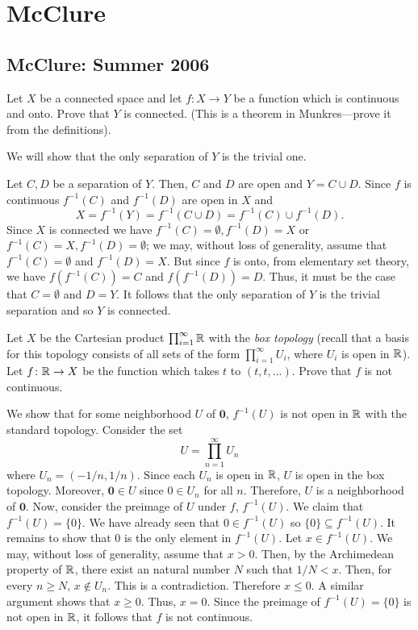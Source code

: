 \section{McClure}
\subsection{McClure: Summer 2006}
\setcounter{exercise}{0}
\setcounter{equation}{0}

\begin{problem}
  Let $X$ be a connected space and let $f\colon X\to Y$ be a function which
  is continuous and onto. Prove that $Y$ is connected. (This is a theorem
  in Munkres---prove it from the definitions).
\end{problem}
\begin{solution}
  We will show that the only separation of $Y$ is the trivial one.

  Let $C,D$ be a separation of $Y$. Then, $C$ and $D$ are open and $Y=C\cup
  D$. Since $f$ is continuous $f^{-1}(C)$ and $f^{-1}(D)$ are open in $X$
  and
  \[
    X=f^{-1}(Y)=f^{-1}(C\cup D)=f^{-1}(C)\cup f^{-1}(D).
  \]
  Since $X$ is connected we have $f^{-1}(C)=\emptyset,f^{-1}(D)=X$ or
  $f^{-1}(C)=X,f^{-1}(D)=\emptyset$; we may, without loss of generality,
  assume that $f^{-1}(C)=\emptyset$ and $f^{-1}(D)=X$. But since $f$ is
  onto, from elementary set theory, we have $f(f^{-1}(C))=C$ and
  $f(f^{-1}(D))=D$. Thus, it must be the case that $C=\emptyset$ and
  $D=Y$. It follows that the only separation of $Y$ is the trivial
  separation and so $Y$ is connected.
\end{solution}

\begin{problem}
  Let $X$ be the Cartesian product $\prod_{i=1}^\infty\mathbb{R}$ with the
  \emph{box topology} (recall that a basis for this topology consists of
  all sets of the form $\prod_{i=1}^\infty U_i$, where $U_i$ is open in
  $\mathbb{R}$). Let $f\colon\mathbb{R}\to X$ be the function which takes $t$ to
  $(t,t,\ldots)$. Prove that $f$ is not continuous.
\end{problem}
\begin{solution}
  We show that for some neighborhood $U$ of $\mathbf{0}$, $f^{-1}(U)$ is
  not open in $\mathbb{R}$ with the standard topology. Consider the set
  \[
    U=\prod_{n=1}^\infty U_n
  \]
  where $U_n=(-1/n,1/n)$. Since each $U_n$ is open in $\mathbb{R}$, $U$ is open
  in the box topology. Moreover, $\mathbf{0}\in U$ since $0\in U_n$ for all
  $n$. Therefore, $U$ is a neighborhood of $\mathbf{0}$. Now, consider the
  preimage of $U$ under $f$, $f^{-1}(U)$. We claim that
  $f^{-1}(U)=\{0\}$. We have already seen that $0\in f^{-1}(U)$ so
  $\{0\}\subseteq f^{-1}(U)$. It remains to show that $0$ is the only element
  in $f^{-1}(U)$. Let $x\in f^{-1}(U)$. We may, without loss of generality,
  assume that $x>0$. Then, by the Archimedean property of $\mathbb{R}$, there
  exist an natural number $N$ such that $1/N<x$. Then, for every $n\geq N$,
  $x\notin U_n$. This is a contradiction. Therefore $x\leq 0$. A similar
  argument shows that $x\geq 0$. Thus, $x=0$. Since the preimage of
  $f^{-1}(U)=\{0\}$ is not open in $\mathbb{R}$, it follows that $f$ is not
  continuous.
\end{solution}

